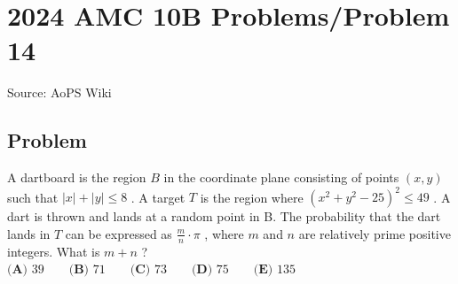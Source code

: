 \documentclass[12pt]{article}
\begin{document}
\section*{{2024 AMC 10B Problems/Problem 14}}
Source: AoPS Wiki

\subsection*{Problem}
A dartboard is the region $B$ in the coordinate plane consisting of points $(x, y)$ such that $|x| + |y| \le 8$ . A target $T$ is the region where $(x^2 + y^2 - 25)^2 \le 49$ . A dart is thrown and lands at a random point in B. The probability that the dart lands in $T$ can be expressed as $\frac{m}{n} \cdot \pi$ , where $m$ and $n$ are relatively prime positive integers. What is $m + n$ ? $\textbf{(A) }39 \qquad \textbf{(B) }71 \qquad \textbf{(C) }73 \qquad \textbf{(D) }75 \qquad \textbf{(E) }135 \qquad$
\end{document}
